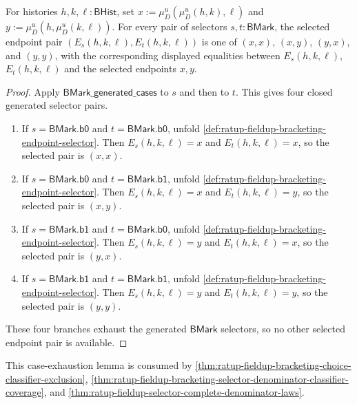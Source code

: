 \begin{lemma}
\label{lem:ratup-fieldup-bracketing-endpoint-selector-exhaustion}
For histories $h,k,\ell:\mathsf{BHist}$, set
$x:=\mu_D^u(\mu_D^u(h,k),\ell)$ and
$y:=\mu_D^u(h,\mu_D^u(k,\ell))$. For every pair of selectors
$s,t:\mathsf{BMark}$, the selected endpoint pair
$(E_s(h,k,\ell),E_t(h,k,\ell))$ is one of
$(x,x)$, $(x,y)$, $(y,x)$, and $(y,y)$, with the corresponding displayed
equalities between $E_s(h,k,\ell)$, $E_t(h,k,\ell)$ and the selected endpoints
$x,y$.
\end{lemma}
\begin{proof}
Apply $\mathsf{BMark\_generated\_cases}$ to $s$ and then to $t$. This gives
four closed generated selector pairs.

\begin{enumerate}
  \item If $s=\mathsf{BMark.b0}$ and $t=\mathsf{BMark.b0}$, unfold
  \autoref{def:ratup-fieldup-bracketing-endpoint-selector}. Then
  $E_s(h,k,\ell)=x$ and $E_t(h,k,\ell)=x$, so the selected pair is $(x,x)$.

  \item If $s=\mathsf{BMark.b0}$ and $t=\mathsf{BMark.b1}$, unfold
  \autoref{def:ratup-fieldup-bracketing-endpoint-selector}. Then
  $E_s(h,k,\ell)=x$ and $E_t(h,k,\ell)=y$, so the selected pair is $(x,y)$.

  \item If $s=\mathsf{BMark.b1}$ and $t=\mathsf{BMark.b0}$, unfold
  \autoref{def:ratup-fieldup-bracketing-endpoint-selector}. Then
  $E_s(h,k,\ell)=y$ and $E_t(h,k,\ell)=x$, so the selected pair is $(y,x)$.

  \item If $s=\mathsf{BMark.b1}$ and $t=\mathsf{BMark.b1}$, unfold
  \autoref{def:ratup-fieldup-bracketing-endpoint-selector}. Then
  $E_s(h,k,\ell)=y$ and $E_t(h,k,\ell)=y$, so the selected pair is $(y,y)$.
\end{enumerate}

These four branches exhaust the generated $\mathsf{BMark}$ selectors, so no
other selected endpoint pair is available.
\end{proof}

This case-exhaustion lemma is consumed by
\autoref{thm:ratup-fieldup-bracketing-choice-classifier-exclusion},
\autoref{thm:ratup-fieldup-bracketing-selector-denominator-classifier-coverage},
and \autoref{thm:ratup-fieldup-selector-complete-denominator-laws}.

